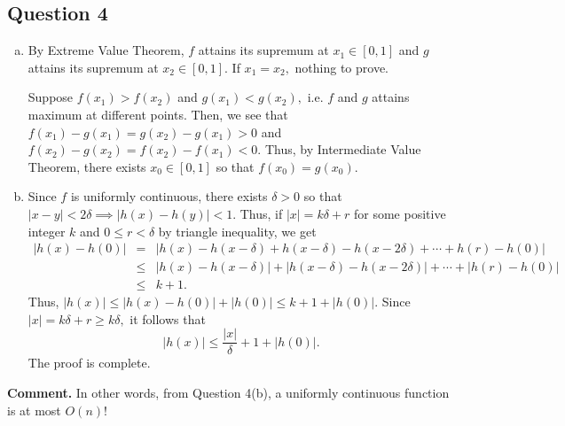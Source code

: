 \documentclass{article}
\begin{document}
\subsection*{Question 4}
\begin{enumerate}[(a)]
    \item By Extreme Value Theorem, $f$ attains its supremum at $x_1\in[0,1]$ and $g$ attains its supremum at $x_2\in[0,1].$ If $x_1=x_2,$ nothing to prove.
    
    Suppose $f(x_1)>f(x_2)$ and $g(x_1)<g(x_2),$ i.e. $f$ and $g$ attains maximum at different points. Then, we see that $f(x_1)-g(x_1)=g(x_2)-g(x_1)>0$ and $f(x_2)-g(x_2)=f(x_2)-f(x_1)<0.$ Thus, by Intermediate Value Theorem, there exists $x_0\in[0,1]$ so that $f(x_0)=g(x_0).$
    \item Since $f$ is uniformly continuous, there exists $\delta>0$ so that $|x-y|<2\delta\implies|h(x)-h(y)|<1.$ Thus, if $|x|=k\delta+r$ for some positive integer $k$ and $0\leq r<\delta$ by triangle inequality, we get 
    \begin{eqnarray*}
    |h(x)-h(0)|&=&|h(x)-h(x-\delta)+h(x-\delta)-h(x-2\delta)+\cdots+h(r)-h(0)|\\
    &\leq&|h(x)-h(x-\delta)|+|h(x-\delta)-h(x-2\delta)|+\cdots+|h(r)-h(0)|\\
    &\leq&k+1.
    \end{eqnarray*}
    Thus, $|h(x)|\leq |h(x)-h(0)|+|h(0)|\leq k+1+|h(0)|.$ Since $|x|=k\delta+r\geq k\delta,$ it follows that $$|h(x)|\leq \dfrac{|x|}{\delta}+1+|h(0)|.$$ The proof is complete.
\end{enumerate}
\textbf{Comment.} In other words, from Question 4(b), a uniformly continuous function is at most $O(n)!$
\end{document}
